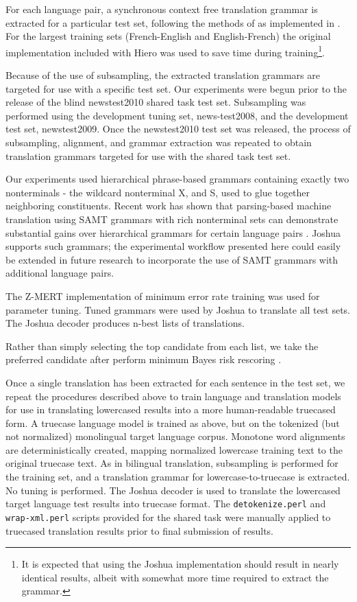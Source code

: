 \documentclass[11pt]{article}
\begin{document}
For each language pair, a synchronous context free translation grammar is extracted for a particular test set, following the methods of  as implemented in \cite{Schwartz-PBML}. For the largest training sets (French-English and English-French) the original \cite{Lopez2008} implementation included with Hiero was used to save time during training\footnote{It is expected that using the Joshua implementation should result in nearly identical results, albeit with somewhat more time required to extract the grammar.}.

Because of the use of subsampling, the extracted translation grammars are targeted for use with a specific test set. Our experiments were begun prior to the release of the blind newstest2010 shared task test set. Subsampling was performed using the development tuning set, news-test2008, and the development test set, newstest2009. Once the newstest2010 test set was released, the process of subsampling, alignment, and grammar extraction was repeated to obtain translation grammars targeted for use with the shared task test set. 

Our experiments used hierarchical phrase-based grammars containing exactly two nonterminals - the wildcard nonterminal X, and S, used to glue together neighboring constituents. Recent work has shown that parsing-based machine translation using SAMT \cite{samt2006} grammars with rich nonterminal sets can demonstrate substantial gains over hierarchical grammars for certain language pairs \cite{SCALE-report}. Joshua supports such grammars; the experimental workflow presented here could easily be extended in future research to incorporate the use of SAMT grammars with additional language pairs. 

The Z-MERT implementation \cite{Zaidan2009} of minimum error rate training \cite{Och2003c} was used for parameter tuning. Tuned grammars were used by Joshua to translate all test sets. The Joshua decoder produces n-best lists of translations. 

Rather than simply selecting the top candidate from each list, we take the preferred candidate after perform minimum Bayes risk rescoring \cite{Kumar2004b}.

Once a single translation has been extracted for each sentence in the test set, we repeat the procedures described above to train language and translation models for use in translating lowercased results into a more human-readable truecased form. A truecase language model is trained as above, but on the tokenized (but not normalized) monolingual target language corpus. Monotone word alignments are deterministically created, mapping normalized lowercase training text to the original truecase text. As in bilingual translation, subsampling is performed for the training set, and a translation grammar for lowercase-to-truecase is extracted. No tuning is performed. The Joshua decoder is used to translate the lowercased target language test results into truecase format. The {\tt detokenize.perl} and {\tt wrap-xml.perl} scripts provided for the shared task were manually applied to truecased translation results prior to final submission of results.
\end{document}
